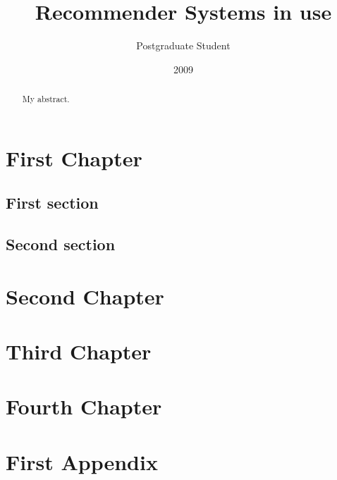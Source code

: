 \documentclass[10pt,twoside,openright]{report}
\title{Recommender Systems in use}
\author{Postgraduate Student}
\date{2009}
\begin{document}
\maketitle

\declaration

\dedication{To my ...}

\begin{abstract}
My abstract.
\end{abstract}

\tableofcontents

\chapter{First Chapter}

\section{First section}

\section{Second section}

\chapter{Second Chapter}

\chapter{Third Chapter}

\chapter{Fourth Chapter}

\appendix

\chapter{First Appendix}
\end{document}
